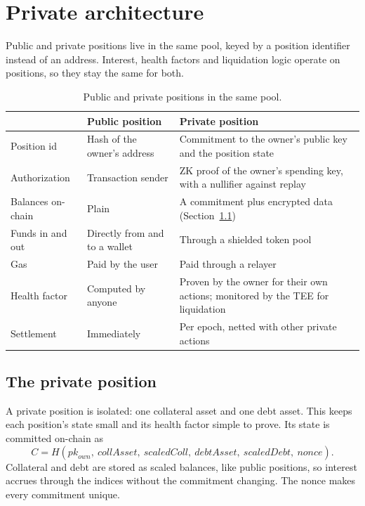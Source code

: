 \documentclass[11pt,a4paper]{article}
\begin{document}
\section{Private architecture}

Public and private positions live in the same pool, keyed by a position identifier instead of an address.
Interest, health factors and liquidation logic operate on positions, so they stay the same for both.

\begin{table}[h]
\centering
\caption{Public and private positions in the same pool.}
\begin{tabularx}{\textwidth}{@{}p{3cm}LL@{}}
\toprule
 & Public position & Private position \\
\midrule
Position id & Hash of the owner's address & Commitment to the owner's public key and the position state \\ \addlinespace
Authorization & Transaction sender & ZK proof of the owner's spending key, with a nullifier against replay \\ \addlinespace
Balances on-chain & Plain & A commitment plus encrypted data (Section~\ref{sec:privpos}) \\ \addlinespace
Funds in and out & Directly from and to a wallet & Through a shielded token pool \\ \addlinespace
Gas & Paid by the user & Paid through a relayer \\ \addlinespace
Health factor & Computed by anyone & Proven by the owner for their own actions; monitored by the TEE for
  liquidation \\ \addlinespace
Settlement & Immediately & Per epoch, netted with other private actions \\
\bottomrule
\end{tabularx}
\end{table}

\subsection{The private position}
\label{sec:privpos}

A private position is isolated: one collateral asset and one debt asset. This keeps each position's state small
and its health factor simple to prove. Its state is committed on-chain as
\[
  C = H(\mathit{pk}_{\mathit{own}},\ \mathit{collAsset},\ \mathit{scaledColl},\ \mathit{debtAsset},\
  \mathit{scaledDebt},\ \mathit{nonce}).
\]
Collateral and debt are stored as scaled balances, like public positions, so interest accrues through the
indices without the commitment changing. The nonce makes every commitment unique.
\end{document}
